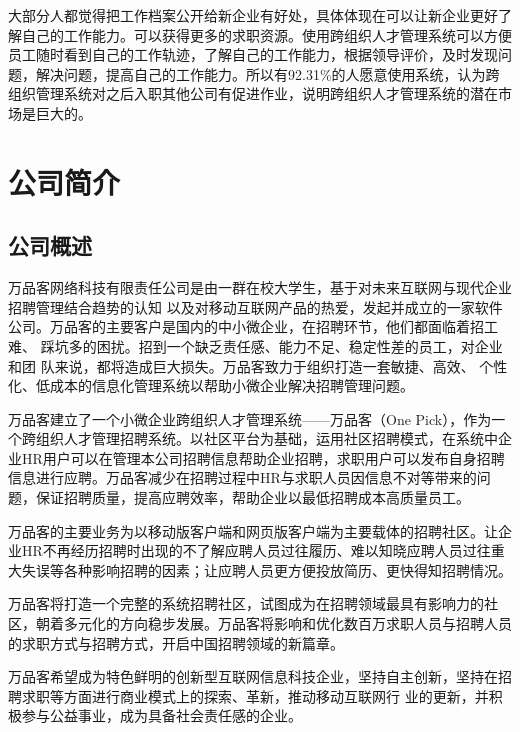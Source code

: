 \documentclass[UTF8]{ctexart}
\begin{document}
大部分人都觉得把工作档案公开给新企业有好处，具体体现在可以让新企业更好了解自己的工作能力。可以获得更多的求职资源。使用跨组织人才管理系统可以方便员工随时看到自己的工作轨迹，了解自己的工作能力，根据领导评价，及时发现问题，解决问题，提高自己的工作能力。所以有92.31\%的人愿意使用系统，认为跨组织管理系统对之后入职其他公司有促进作业，说明跨组织人才管理系统的潜在市场是巨大的。

\section{公司简介}
\subsection{公司概述}
万品客网络科技有限责任公司是由一群在校大学生，基于对未来互联网与现代企业招聘管理结合趋势的认知 以及对移动互联网产品的热爱，发起并成立的一家软件公司。万品客的主要客户是国内的中小微企业，在招聘环节，他们都面临着招工难、 踩坑多的困扰。招到一个缺乏责任感、能力不足、稳定性差的员工，对企业和团 队来说，都将造成巨大损失。万品客致力于组织打造一套敏捷、高效、 个性化、低成本的信息化管理系统以帮助小微企业解决招聘管理问题。

万品客建立了一个小微企业跨组织人才管理系统——万品客（One Pick），作为一个跨组织人才管理招聘系统。以社区平台为基础，运用社区招聘模式，在系统中企业HR用户可以在管理本公司招聘信息帮助企业招聘，求职用户可以发布自身招聘信息进行应聘。万品客减少在招聘过程中HR与求职人员因信息不对等带来的问题，保证招聘质量，提高应聘效率，帮助企业以最低招聘成本高质量员工。

万品客的主要业务为以移动版客户端和网页版客户端为主要载体的招聘社区。让企业HR不再经历招聘时出现的不了解应聘人员过往履历、难以知晓应聘人员过往重大失误等各种影响招聘的因素；让应聘人员更方便投放简历、更快得知招聘情况。

万品客将打造一个完整的系统招聘社区，试图成为在招聘领域最具有影响力的社区，朝着多元化的方向稳步发展。万品客将影响和优化数百万求职人员与招聘人员的求职方式与招聘方式，开启中国招聘领域的新篇章。

万品客希望成为特色鲜明的创新型互联网信息科技企业，坚持自主创新，坚持在招聘求职等方面进行商业模式上的探索、革新，推动移动互联网行 业的更新，并积极参与公益事业，成为具备社会责任感的企业。
\end{document}
